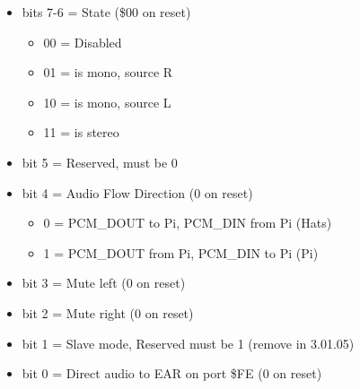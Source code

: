 \begin{itemize}
\item bits 7-6 = \iis State (\$00 on reset)
  \begin{itemize}
  \item 00 = \iis Disabled
  \item 01 = \iis is mono, source R
  \item 10 = \iis is mono, source L
  \item 11 = \iis is stereo
  \end{itemize}
\item bit 5 = Reserved, must be 0
\item bit 4 = Audio Flow Direction (0 on reset)
  \begin{itemize}
  \item 0 = PCM\_DOUT to Pi, PCM\_DIN from Pi (Hats)
  \item 1 = PCM\_DOUT from Pi, PCM\_DIN to Pi (Pi)
  \end{itemize}
\item bit 3 = Mute left (0 on reset)
\item bit 2 = Mute right (0 on reset)
\item bit 1 = Slave mode, Reserved must be 1 (remove in 3.01.05)
\item bit 0 = Direct \iis audio to EAR on port \$FE (0 on reset)
\end{itemize}

